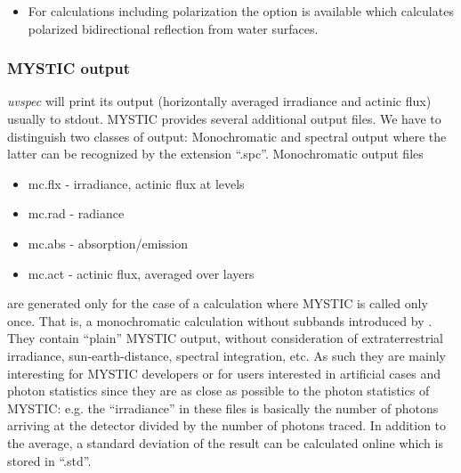 {\begin{itemize}
\begin{itemize}
  \item using  and .
    The first is a RPV
    type for each surface pixel; type is simply a label like 
    "Grass" or "1" or whatever. For each of these types,
     must have an entry which connects the type to
    a file which contains wavelength-dependent RPVs. Sounds
    complicated but is a very efficient way to define a
    wavelength-dependent 2D RPV. Label ``CaM'' is reserved for Cox and Munk 
    and invokes the Cox and Munk ocean BRDF for the respective pixel. Thus
    it is possible to combine land and ocean BRDFs.
  \end{itemize}
\item For calculations including polarization the option
   is available which calculates polarized
  bidirectional reflection from water surfaces. 
\end{itemize}
}

\subsubsection{MYSTIC output}

{\sl uvspec} will print its output (horizontally averaged 
irradiance and actinic flux) usually to stdout. MYSTIC provides 
several additional output 
files. We have to distinguish two classes of output: 
Monochromatic and spectral output where the latter can be recognized 
by the extension ``.spc''. Monochromatic output files

\begin{itemize}
\item mc.flx - irradiance, actinic flux at levels
\item mc.rad - radiance 
\item mc.abs - absorption/emission
\item mc.act - actinic flux, averaged over layers
\end{itemize}  

are generated only for the case of a calculation where MYSTIC is called 
only once. That is, a monochromatic calculation without subbands introduced 
by . They contain ``plain'' MYSTIC output, without
consideration of extraterrestrial irradiance, sun-earth-distance, spectral
integration, etc. As such they are mainly interesting for MYSTIC developers
or for users interested in artificial cases and photon statistics since 
they are as close as possible to the photon statistics of MYSTIC: e.g. 
the ``irradiance'' in these files is basically the number of photons arriving
at the detector divided by the number of photons traced. In addition to the 
average, a standard deviation of the result can be calculated online which is 
stored in ``.std''. 

